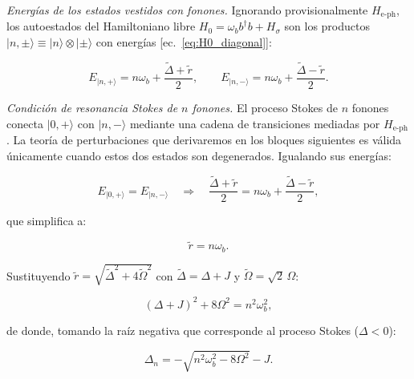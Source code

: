\documentclass[12pt]{article}
\begin{document}

\textit{Energías de los estados vestidos con fonones.}
Ignorando provisionalmente $H_\mathrm{e\text{-}ph}$, los autoestados
del Hamiltoniano libre $H_0 = \omega_b b^\dagger b + H_\sigma$ son
los productos $|n,\pm\rangle \equiv |n\rangle\otimes|\pm\rangle$
con energías [ec.~\eqref{eq:H0_diagonal}]:

\begin{equation}
	E_{|n,+\rangle} = n\omega_b + \frac{\widetilde\Delta + \tilde{r}}{2},
	\qquad
	E_{|n,-\rangle} = n\omega_b + \frac{\widetilde\Delta - \tilde{r}}{2}.
	\label{eq:energias_npm}
\end{equation}

\medskip
\noindent
\textit{Condición de resonancia Stokes de $n$ fonones.}
El proceso Stokes de $n$ fonones conecta $|0,{+}\rangle$
con $|n,{-}\rangle$ mediante una cadena de transiciones mediadas por
$H_\mathrm{e\text{-}ph}$. La teoría de perturbaciones que derivaremos
en los bloques siguientes es válida únicamente cuando estos dos
estados son degenerados. Igualando sus energías:

\begin{equation}
	E_{|0,+\rangle} = E_{|n,-\rangle}
	\quad\Longrightarrow\quad
	\frac{\widetilde\Delta + \tilde{r}}{2}
	= n\omega_b + \frac{\widetilde\Delta - \tilde{r}}{2},
\end{equation}

\noindent
que simplifica a:

\begin{equation}
	\tilde{r} = n\omega_b.
	\label{eq:cond_res_r}
\end{equation}

\noindent
Sustituyendo $\tilde{r} = \sqrt{\widetilde\Delta^2 + 4\widetilde\Omega^2}$
con $\widetilde\Delta = \Delta + J$ y $\widetilde\Omega = \sqrt{2}\,\Omega$:

\begin{equation}
	(\Delta + J)^2 + 8\Omega^2 = n^2\omega_b^2,
\end{equation}

\noindent
de donde, tomando la raíz negativa que corresponde al proceso Stokes
($\Delta < 0$):

\begin{equation}
	\boxed{
		\Delta_n = -\sqrt{n^2\omega_b^2 - 8\Omega^2} - J.
	}
	\label{eq:resonancia_III}
\end{equation}
\end{document}
